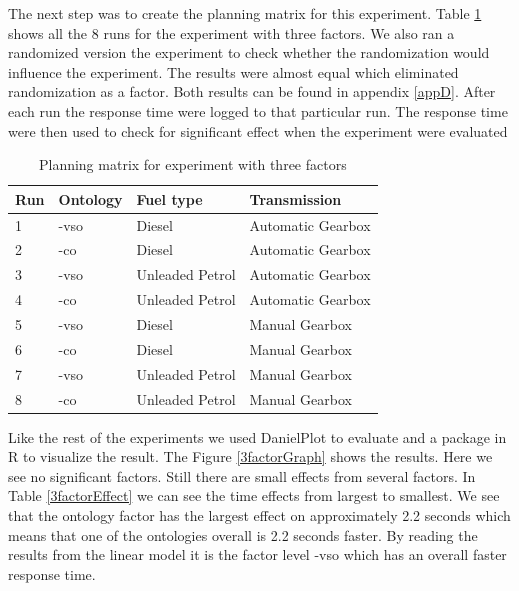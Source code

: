 \documentclass{llncs}
\begin{document}
The next step was to create the planning matrix for this
experiment. Table
\ref{3factor} shows all the 8 runs for the experiment with three
factors. We also ran a randomized version the experiment to check
whether the randomization would influence the experiment. The results
were almost equal which eliminated randomization as a factor.  Both
results can be found in appendix \ref{appD}. After each run the
response time were logged to that particular run. The response time
were then used to check for significant effect when the experiment
were evaluated
\begin{table}
\begin{center}
    \begin{tabular}{ | l | l l l |}
    \hline
    {\bf Run} & {\bf Ontology} & {\bf Fuel type} & {\bf Transmission} \\ \hline
	1 & -vso & Diesel & Automatic Gearbox \\ \hline 
	2 & -co & Diesel & Automatic Gearbox \\ \hline 
	3 & -vso & Unleaded Petrol & Automatic Gearbox \\ \hline 
	4 & -co & Unleaded Petrol & Automatic Gearbox \\ \hline 
	5 & -vso & Diesel & Manual Gearbox \\ \hline 
	6 & -co & Diesel & Manual Gearbox \\ \hline 
	7 & -vso & Unleaded Petrol & Manual Gearbox \\ \hline 
	8 & -co & Unleaded Petrol & Manual Gearbox \\ \hline 
    \end{tabular}
\end{center}
\caption{Planning matrix for experiment with three factors}\label{3factor}
\end{table}

Like the rest of the experiments we used DanielPlot to evaluate and a
package in R to visualize the result. The Figure \ref{3factorGraph}
shows the results.  Here we see no significant factors. Still there
are small effects from several factors. In Table \ref{3factorEffect}
we can see the time effects from largest to smallest.  We see that the
ontology factor has the largest effect on approximately 2.2 seconds
which means that one of the ontologies overall is 2.2 seconds
faster. By reading the results from the linear model it is the factor
level \textsf{-vso} which has an overall faster response time.
\end{document}
